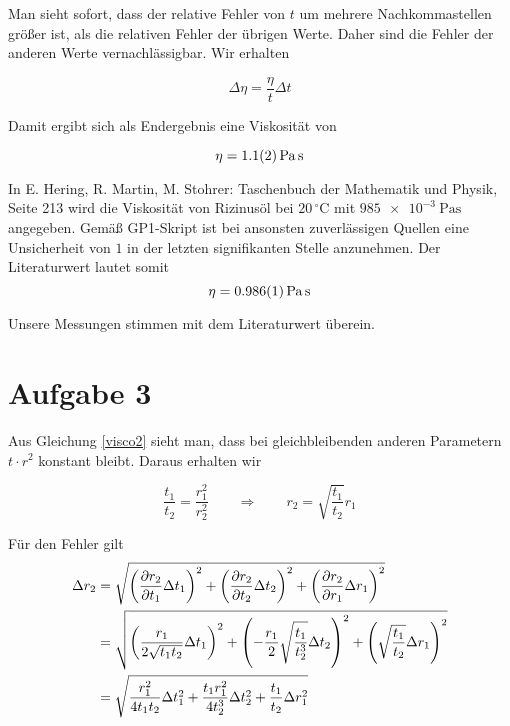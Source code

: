 \documentclass[a4paper,german,12pt,smallheadings]{scrartcl}
\begin{document}
Man sieht sofort, dass der relative Fehler von $t$ um mehrere Nachkommastellen
größer ist, als die relativen Fehler der übrigen Werte. Daher sind die Fehler
der anderen Werte vernachlässigbar. Wir erhalten

\begin{equation}
  \Delta \eta = \frac{\eta}{t} \Delta t
\end{equation}

Damit ergibt sich als Endergebnis eine Viskosität von

\begin{equation*}
  \eta = \SI{1.1+-0.2}{\pascal \second}
\end{equation*}

In E. Hering, R. Martin, M. Stohrer: Taschenbuch der Mathematik und Physik,
Seite 213 wird die Viskosität von Rizinusöl bei $20\,^{\circ}\mathrm{C}$ mit
$\SI{985e-3}{\pascal \second}$ angegeben. Gemäß GP1-Skript ist bei ansonsten
zuverlässigen Quellen eine Unsicherheit von $1$ in der letzten signifikanten
Stelle anzunehmen. Der Literaturwert lautet somit
\begin{equation*}
  \eta = \SI{0.986+-0.001}{\pascal \second}
\end{equation*}

Unsere Messungen stimmen mit dem Literaturwert überein.

\section*{Aufgabe 3}

Aus Gleichung \ref{visco2} sieht man, dass bei gleichbleibenden anderen
Parametern $t \cdot r^2$ konstant bleibt. Daraus erhalten wir

\begin{equation}
  \frac{t_1}{t_2} = \frac{r_1^2}{r_2^2} \qquad \Rightarrow \qquad r_2 = \sqrt{\frac{t_1}{t_2}} r_1
\end{equation}

Für den Fehler gilt
\begin{align*}
  \Delta r_2 &= \sqrt{
    \del{\frac{\partial r_2}{\partial t_1} \Delta t_1}^2 +
    \del{\frac{\partial r_2}{\partial t_2} \Delta t_2}^2 +
    \del{\frac{\partial r_2}{\partial r_1} \Delta r_1}^2
  } \\
  &= \sqrt{
    \del{ \frac{r_1}{2 \sqrt{t_1 t_2}} \Delta t_1 }^2 +
    \del{ -\frac{r_1}{2} \sqrt{ \frac{t_1}{t_2^3}} \Delta t_2 }^2 +
    \del{ \sqrt{ \frac{t_1}{t_2}} \Delta r_1 }^2
  } \\
  &= \sqrt{
    \frac{r_1^2}{4 t_1 t_2} \Delta t_1^2 + \frac{t_1 r_1^2}{4 t_2^3} \Delta t_2^2 + \frac{t_1}{t_2} \Delta r_1^2
  }
\end{align*}
\end{document}
